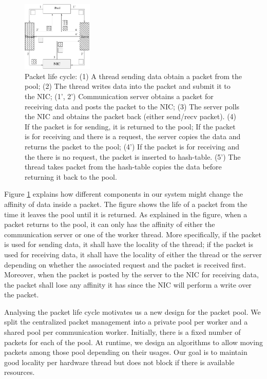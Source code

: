 \begin{figure}[t]
  \centering 
  \includegraphics[width=0.3\textwidth]{fig/packetlife.pdf}
  \caption{Packet life cycle: (1) A thread sending data obtain a packet from the
    pool; (2) The thread writes data into the packet and submit it to the NIC;
    (1', 2') Communication server obtains a packet for receiving data
    and posts the packet to the NIC;
    (3) The server polls the NIC and obtains the packet back (either send/recv packet).
    (4) If the packet is for sending, it is returned to the pool;
    If the packet is for receiving and there is a request, the server copies the data
    and returns the packet to the pool;
    (4') If the packet is for receiving and the there is no request, the packet is inserted to hash-table.
    (5') The thread takes packet from the hash-table copies the data before returning it back to the pool.}
  
  \label{fig:packetlife}
\end{figure}

Figure \ref{fig:packetlife} explains how different components in our system
might change the affinity of data inside a packet. The figure shows the life of
a packet from the time it leaves the pool until it is returned. As explained in
the figure, when a packet returns to the pool, it can only has the affinity
of either the communication server or one of the worker thread. More specifically,
if the packet is used for sending data, it shall have the locality of the thread;
if the packet is used for receiving data, it shall have the locality of either
the thread or the server depending on whether the associated request and the
packet is received first. Moreover, when the packet is posted by the server
to the NIC for receiving data, the packet shall lose any affinity it has since
the NIC will perform a write over the packet.

Analysing the packet life cycle motivates us a new design for the packet pool.
We split the centralized packet management into a private pool per worker and a
shared pool per communication worker. Initially, there is a fixed number of
packets for each of the pool. At runtime, we design an algorithms to allow
moving packets among those pool depending on their usages.  Our goal is to
maintain good locality per hardware thread but does not block if there is
available resources.


